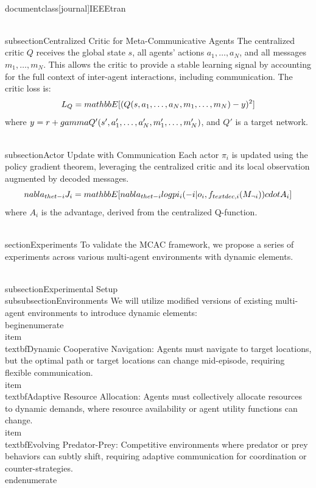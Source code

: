 \\documentclass[journal]{IEEEtran}
\begin{document}
\\subsection{Centralized Critic for Meta-Communicative Agents}
The centralized critic $Q$ receives the global state $s$, all agents' actions $a_1, \dots, a_N$, and all messages $m_1, \dots, m_N$. This allows the critic to provide a stable learning signal by accounting for the full context of inter-agent interactions, including communication.
The critic loss is:
$$ L_Q = \\mathbb{E}[(Q(s, a_1, \dots, a_N, m_1, \dots, m_N) - y)^2] $$
where $y = r + \\gamma Q'(s', a'_1, \dots, a'_N, m'_1, \dots, m'_N)$, and $Q'$ is a target network.

\\subsection{Actor Update with Communication}
Each actor $\pi_i$ is updated using the policy gradient theorem, leveraging the centralized critic and its local observation augmented by decoded messages.
$$ \\nabla_{\\thet-i} J_i = \\mathbb{E}[\\nabla_{\\thet-i} \\log \\pi_i(-i | o_i, f_{\\text{dec},i}(M_{\neg i})) \\cdot A_i] $$
where $A_i$ is the advantage, derived from the centralized Q-function.

\\section{Experiments}
To validate the MCAC framework, we propose a series of experiments across various multi-agent environments with dynamic elements.

\\subsection{Experimental Setup}
\\subsubsection{Environments}
We will utilize modified versions of existing multi-agent environments to introduce dynamic elements:
\\begin{enumerate}
    \\item \\textbf{Dynamic Cooperative Navigation}: Agents must navigate to target locations, but the optimal path or target locations can change mid-episode, requiring flexible communication.
    \\item \\textbf{Adaptive Resource Allocation}: Agents must collectively allocate resources to dynamic demands, where resource availability or agent utility functions can change.
    \\item \\textbf{Evolving Predator-Prey}: Competitive environments where predator or prey behaviors can subtly shift, requiring adaptive communication for coordination or counter-strategies.
\\end{enumerate}
\end{document}
